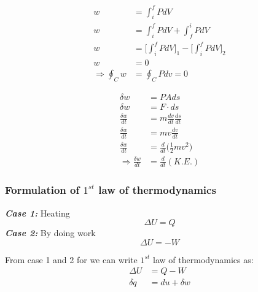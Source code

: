 \documentclass[fleqn,10pt]{SelfArx} %
\begin{document}
\begin{align}
    w &= \int_i^f PdV \\
    w &= \int_i^f PdV + \int_f^i PdV \\
    w &= \Big[\int_i^f PdV\Big]_1 - \Big[\int_i^f PdV \Big]_2 \\
    w &= 0 \\
    \Rightarrow \oint_C w &= \oint_C Pdv = 0
\end{align}

\begin{align}
    \delta w &= PAds \\
    \delta w &= F\cdot ds \\ 
    \displaystyle\frac{\delta w}{dt} &= m \frac{dv}{dt} \frac{ds}{dt} \\ 
    \frac{\delta w}{dt} &= mv\frac{dv}{dt} \\ 
    \frac{\delta w}{dt} &= \frac{d}{dt} \Big( \displaystyle\frac{1}{2} mv^2 \Big) \\
    \Rightarrow \frac{\delta w}{dt} &= \frac{d}{dt} (K.E.)
\end{align}

\subsubsection*{Formulation of $1^{st}$ law of thermodynamics}

\textbf{\textit{Case 1:}} Heating
        $$\Delta U = Q$$
\textbf{\textit{Case 2:}} By doing work
        $$\Delta U = -W$$

From case 1 and 2 for we can write $1^{st}$ law of thermodynamics as:
\begin{align}
    \Delta U &= Q - W \\
    \delta q &= du + \delta w
\end{align}

\begin{center}
\end{center}
\end{document}

